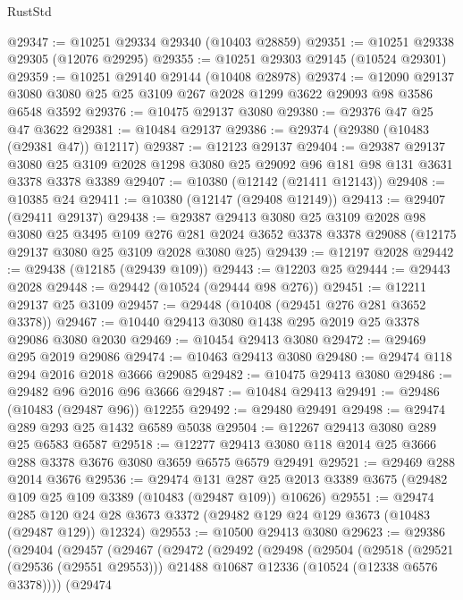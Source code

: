 \begin{lexlean}{RustStd}
\begin{coremodule}
@29347 := @10251 @29334 @29340 (@10403 @28859)
@29351 := @10251 @29338 @29305 (@12076 @29295)
@29355 := @10251 @29303 @29145 (@10524 @29301)
@29359 := @10251 @29140 @29144 (@10408 @28978)
@29374 := @12090
    @29137
    @3080
    @3080
    @25
    @25
    @3109
    @267
    @2028
    @1299
    @3622
    @29093
    @98
    @3586
    @6548
    @3592
@29376 := @10475 @29137 @3080
@29380 := @29376 @47 @25 @47 @3622
@29381 := @10484 @29137
@29386 := @29374 (@29380 (@10483 (@29381 @47)) @12117)
@29387 := @12123 @29137
@29404 := @29387
    @29137
    @3080
    @25
    @3109
    @2028
    @1298
    @3080
    @25
    @29092
    @96
    @181
    @98
    @131
    @3631
    @3378
    @3378
    @3389
@29407 := @10380 (@12142 (@21411 @12143))
@29408 := @10385 @24
@29411 := @10380 (@12147 (@29408 @12149))
@29413 := @29407 (@29411 @29137)
@29438 := @29387
    @29413
    @3080
    @25
    @3109
    @2028
    @98
    @3080
    @25
    @3495
    @109
    @276
    @281
    @2024
    @3652
    @3378
    @3378
    @29088
    (@12175 @29137 @3080 @25 @3109 @2028 @3080 @25)
@29439 := @12197 @2028
@29442 := @29438 (@12185 (@29439 @109))
@29443 := @12203 @25
@29444 := @29443 @2028
@29448 := @29442 (@10524 (@29444 @98 @276))
@29451 := @12211 @29137 @25 @3109
@29457 := @29448 (@10408 (@29451 @276 @281 @3652 @3378))
@29467 := @10440 @29413 @3080 @1438 @295 @2019 @25 @3378 @29086 @3080 @2030
@29469 := @10454 @29413 @3080
@29472 := @29469 @295 @2019 @29086
@29474 := @10463 @29413 @3080
@29480 := @29474 @118 @294 @2016 @2018 @3666 @29085
@29482 := @10475 @29413 @3080
@29486 := @29482 @96 @2016 @96 @3666
@29487 := @10484 @29413
@29491 := @29486 (@10483 (@29487 @96)) @12255
@29492 := @29480 @29491
@29498 := @29474 @289 @293 @25 @1432 @6589 @5038
@29504 := @12267 @29413 @3080 @289 @25 @6583 @6587
@29518 := @12277 @29413 @3080 @118 @2014 @25 @3666 @288 @3378 @3676 @3080 @3659 @6575 @6579 @29491
@29521 := @29469 @288 @2014 @3676
@29536 := @29474
    @131
    @287
    @25
    @2013
    @3389
    @3675
    (@29482 @109 @25 @109 @3389 (@10483 (@29487 @109)) @10626)
@29551 := @29474
    @285
    @120
    @24
    @28
    @3673
    @3372
    (@29482 @129 @24 @129 @3673 (@10483 (@29487 @129)) @12324)
@29553 := @10500 @29413 @3080
@29623 := @29386
    (@29404
      (@29457
        (@29467
          (@29472
            (@29492
              (@29498
                (@29504
                  (@29518
                    (@29521 (@29536 (@29551 @29553)))
                    @21488
                    @10687
                    @12336
                    (@10524 (@12338 @6576 @3378))))
                (@29474

\end{coremodule}
\end{lexlean}
